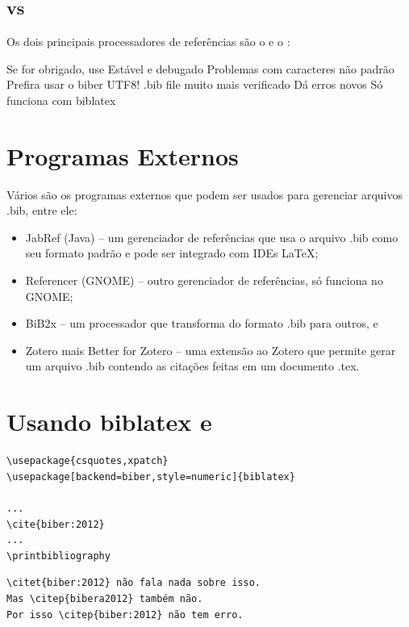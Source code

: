 \subsection{ vs }

Os dois principais processadores de referências são o  e o  :
\begin{outline}
    \1 
    \2 Se for obrigado, use 
    \2 Estável e debugado
    \2 Problemas com caracteres não padrão 
    \1 
    \2 Prefira usar o  biber
    \2 UTF8!
    \2 .bib file muito mais verificado
    \3 Dá erros novos
    \2 Só funciona com biblatex
\end{outline}


\section{Programas Externos}

Vários são os programas externos que podem ser usados
para gerenciar arquivos .bib, entre ele:

\begin{itemize}
    \item JabRef (Java) -- um gerenciador de referências que usa o arquivo .bib como seu formato padrão e pode ser integrado com IDEs \LaTeX;
    \item Referencer (GNOME) -- outro gerenciador de referências, só funciona no GNOME;
    \item BiB2x  -- um processador que transforma do formato .bib para outros, e
    \item Zotero mais Better  for Zotero -- uma extensão ao Zotero que permite gerar um arquivo .bib contendo as citações feitas em um documento .tex.
\end{itemize}

\section{Usando biblatex e }

\begin{lstlisting}[caption=Exemplo de uso de biblatex]
\usepackage{csquotes,xpatch}
\usepackage[backend=biber,style=numeric]{biblatex}

...
\cite{biber:2012}
...
\printbibliography
\end{lstlisting}


\begin{lstlisting}[caption={Controlando a forma de citação com o formato natbib.},label=keyfig:citet]
\citet{biber:2012} não fala nada sobre isso. 
Mas \citep{bibera2012} também não. 
Por isso \citep{biber:2012} não tem erro. 
\end{lstlisting}


